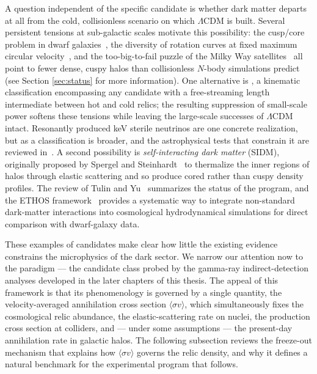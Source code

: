A question independent of the specific candidate is whether dark matter departs at all from the cold, collisionless scenario on which $\Lambda$CDM is built.
Several persistent tensions at sub-galactic scales motivate this possibility: the cusp/core problem in dwarf galaxies~\cite{Flores:1994gz,Moore:1994yx}, the diversity of rotation curves at fixed maximum circular velocity~\cite{Oman:2015xda}, and the too-big-to-fail puzzle of the Milky Way satellites~\cite{Boylan-Kolchin:2011qkt,Boylan-Kolchin:2011lmk} all point to fewer dense, cuspy halos than collisionless $N$-body simulations predict~\cite{Bullock:2017xww} (see Section \ref{sec:status} for more information).
One alternative is \emph{\WDM}, a kinematic classification encompassing any candidate with a free-streaming length intermediate between hot and cold relics; the resulting suppression of small-scale power softens these tensions while leaving the large-scale successes of $\Lambda$CDM intact.
Resonantly produced keV sterile neutrinos are one concrete realization, but \WDM as a classification is broader, and the astrophysical tests that constrain it are reviewed in~\cite{Adhikari:2022sbh}.
A second possibility is \emph{self-interacting dark matter} (SIDM), originally proposed by Spergel and Steinhardt~\cite{Spergel:1999mh} to thermalize the inner regions of halos through elastic scattering and so produce cored rather than cuspy density profiles.
The review of Tulin and Yu~\cite{Tulin:2017ara} summarizes the status of the program, and the ETHOS framework~\cite{Cyr-Racine:2015ihg} provides a systematic way to integrate non-standard dark-matter interactions into cosmological hydrodynamical simulations for direct comparison with dwarf-galaxy data.

These examples of candidates make clear how little the existing evidence constrains the microphysics of the dark sector.
We narrow our attention now to the \WIMP paradigm --- the candidate class probed by the gamma-ray indirect-detection analyses developed in the later chapters of this thesis.
The appeal of this framework is that its phenomenology is governed by a single quantity, the velocity-averaged annihilation cross section $\langle\sigma v\rangle$, which simultaneously fixes the cosmological relic abundance, the elastic-scattering rate on nuclei, the production cross section at colliders, and --- under some assumptions --- the present-day annihilation rate in galactic halos.
The following subsection reviews the freeze-out mechanism that explains how $\langle\sigma v\rangle$ governs the relic density, and why it defines a natural benchmark for the experimental program that follows.


